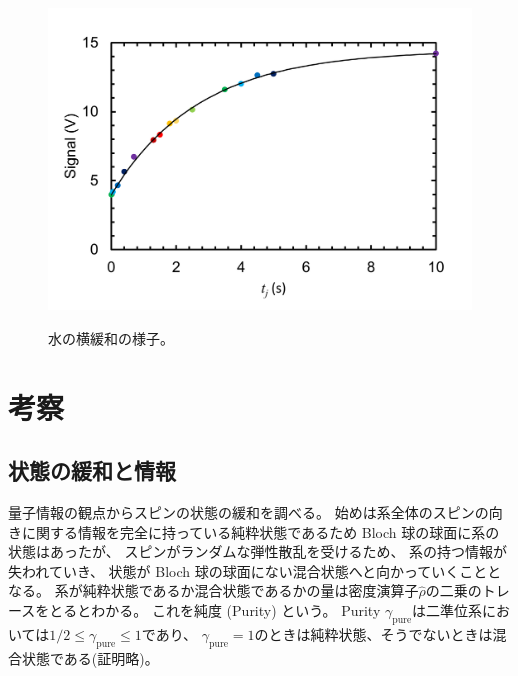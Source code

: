 \documentclass[11pt,dvipdfmx,a4paper]{jsarticle}
\begin{document}
\begin{figure}[H]
\begin{minipage}[t]{0.48\columnwidth}
		\label{graph:water_fit}
	\end{minipage}\\
	\begin{minipage}[t]{0.48\columnwidth}
		\centering
		\includegraphics[width=\columnwidth]{graph/T1_water.png}
		\label{graph:T1_water}
	\end{minipage}
	\caption{水の横緩和の様子。}
	\label{graph:water}
\end{figure}

\section{考察}
\subsection{状態の緩和と情報}

量子情報の観点からスピンの状態の緩和を調べる。
始めは系全体のスピンの向きに関する情報を完全に持っている純粋状態であるため Bloch 球の球面に系の状態はあったが、
スピンがランダムな弾性散乱を受けるため、
系の持つ情報が失われていき、
状態が Bloch 球の球面にない混合状態へと向かっていくこととなる。
系が純粋状態であるか混合状態であるかの量は密度演算子\(\hat{\rho}\)の二乗のトレースをとるとわかる。
これを純度 (Purity) という。
 Purity \(\gamma_{\text{pure}}\)は二準位系においては\(1/2 \leq \gamma_{\text{pure}}\leq 1\)であり、
\(\gamma_{\text{pure}} = 1\)のときは純粋状態、そうでないときは混合状態である(証明略)。
\end{document}
